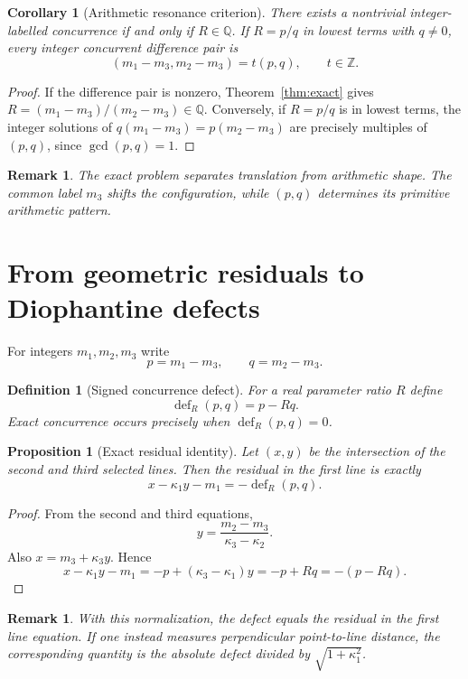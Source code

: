 \documentclass[11pt,a4paper]{article}
\newcommand{\defect}{\operatorname{def}}
\newtheorem{proposition}[theorem]{Proposition}
\newtheorem{corollary}[theorem]{Corollary}
\newtheorem{definition}[theorem]{Definition}
\newtheorem{remark}[theorem]{Remark}
\begin{document}
\begin{corollary}[Arithmetic resonance criterion]\label{cor:res}
There exists a nontrivial integer-labelled concurrence if and only if $R\in\mathbb Q$. If
$R=p/q$ in lowest terms with $q\ne0$, every integer concurrent difference pair is
\[
(m_1-m_3,m_2-m_3)=t(p,q),\qquad t\in\mathbb Z.
\]
\end{corollary}

\begin{proof}
If the difference pair is nonzero, Theorem~\ref{thm:exact} gives
$R=(m_1-m_3)/(m_2-m_3)\in\mathbb Q$. Conversely, if $R=p/q$ is in lowest terms, the integer solutions of $q(m_1-m_3)=p(m_2-m_3)$ are precisely multiples of $(p,q)$, since $\gcd(p,q)=1$.
\end{proof}

\begin{remark}
The exact problem separates translation from arithmetic shape. The common label $m_3$ shifts the
configuration, while $(p,q)$ determines its primitive arithmetic pattern.
\end{remark}

\section{From geometric residuals to Diophantine defects}
For integers $m_1,m_2,m_3$ write
\[
p=m_1-m_3,\qquad q=m_2-m_3.
\]

\begin{definition}[Signed concurrence defect]
For a real parameter ratio $R$ define
\[
\defect_R(p,q)=p-Rq.
\]
Exact concurrence occurs precisely when $\defect_R(p,q)=0$.
\end{definition}

\begin{proposition}[Exact residual identity]\label{prop:residual}
Let $(x,y)$ be the intersection of the second and third selected lines. Then the residual in the
first line is exactly
\[
\boxed{x-\kappa_1y-m_1=-\defect_R(p,q).}
\]
\end{proposition}

\begin{proof}
From the second and third equations,
\[
y=\frac{m_2-m_3}{\kappa_3-\kappa_2}.
\]
Also $x=m_3+\kappa_3y$. Hence
\[
x-\kappa_1y-m_1
=-p+(\kappa_3-\kappa_1)y
=-p+Rq
=-(p-Rq).
\]
\end{proof}

\begin{remark}
With this normalization, the defect equals the residual in the first line equation. If one instead measures perpendicular point-to-line distance, the corresponding quantity
is the absolute defect divided by $\sqrt{1+\kappa_1^2}$.
\end{remark}
\end{document}
